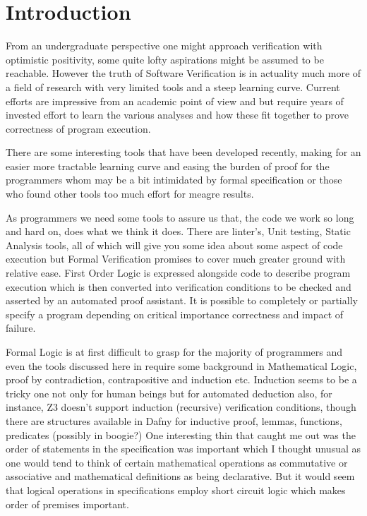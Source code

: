 \documentclass[10pt]{article} %
\begin{document}
\section{Introduction}
From an undergraduate perspective one might approach verification with optimistic positivity, some quite lofty aspirations might be assumed to be reachable. However the truth of Software Verification is in actuality much more of a field of research with very limited tools and a steep learning curve. Current efforts are impressive from an academic point of view and but require years of invested effort to learn the various analyses and how these fit together to prove correctness of program execution.

There are some interesting tools that have been developed recently, making for an easier more tractable learning curve and easing the burden of proof for the programmers whom may be a bit intimidated by formal specification or those who found other tools too much effort for meagre results.

As programmers we need some tools to assure us that, the code we work so long and hard on, does what we think it does. There are linter's, Unit testing, Static Analysis tools, all of which will give you some idea about some aspect of code execution but Formal Verification promises to cover much greater ground with relative ease. First Order Logic is expressed alongside code to describe program execution which is then converted into verification conditions to be checked and asserted by an automated proof assistant. It is possible to completely or partially specify a program depending on critical importance correctness and impact of failure.

Formal Logic is at first difficult to grasp for the majority of programmers and even the tools discussed here in require some background in Mathematical Logic, proof by contradiction, contrapositive and induction etc. Induction seems to be a tricky one not only for human beings but for automated deduction also, for instance, Z3 doesn't support induction (recursive) verification conditions, though there are structures available in Dafny for inductive proof, lemmas, functions, predicates (possibly in boogie?) One interesting thin that caught me out was the order of statements in the specification was important which I thought unusual as one would tend to think of certain  mathematical operations as commutative or associative and mathematical definitions as being declarative. But it would seem that logical operations in specifications employ short circuit logic which makes order of premises important.
\end{document}

